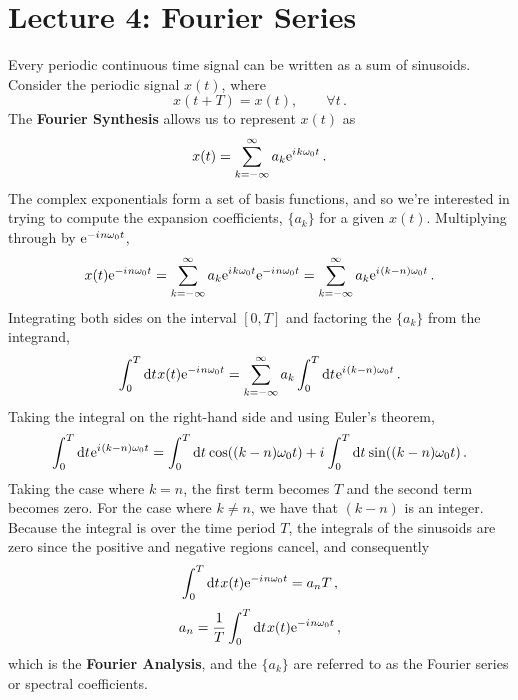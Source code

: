 \section{Lecture 4: Fourier Series}

Every periodic continuous time signal can be written as a sum of sinusoids. Consider
the periodic signal $x(t)$, where
%
\begin{displaymath}
  x(t + T) = x(t), \qquad \forall t \,.
\end{displaymath}
%
The \textbf{Fourier Synthesis} allows us to represent $x(t)$ as
%
\begin{equation}
  x(t) = \sum_{k=-\infty}^\infty a_k\mathrm{e}^{{i\mkern1mu} k\omega_0 t} \,.
\end{equation}
%
The complex exponentials form a set of basis functions, and so we're interested in
trying to compute the expansion coefficients, $\{a_k\}$ for a given $x(t)$.
Multiplying through by $\mathrm{e}^{-{i\mkern1mu} n \omega_0 t}$,
%
\begin{displaymath}
  x(t)\mathrm{e}^{-{i\mkern1mu} n\omega_0 t} = \sum_{k=-\infty}^\infty a_k\mathrm{e}^{{i\mkern1mu} k\omega_0 t}\mathrm{e}^{-{i\mkern1mu} n\omega_0 t}
  = \sum_{k=-\infty}^\infty a_k\mathrm{e}^{{i\mkern1mu} (k-n)\omega_0 t} \,.
\end{displaymath}
%
Integrating both sides on the interval $[0,T]$ and factoring the $\{a_k\}$ from the integrand,
%
\begin{displaymath}
  \int_0^T \mathrm{d}t\mkern1mux(t)\mathrm{e}^{-{i\mkern1mu} n\omega_0 t} = \sum_{k=-\infty}^\infty a_k \int_0^T\mathrm{d}t\mkern1mu \mathrm{e}^{{i\mkern1mu} (k-n)\omega_0 t} \,.
\end{displaymath}
%
Taking the integral on the right-hand side and using Euler's theorem,
%
\begin{displaymath}
  \int_0^T\mathrm{d}t\mkern1mu \mathrm{e}^{{i\mkern1mu} (k-n)\omega_0 t} = \int_0^T\mathrm{d}t\mkern1mu \cos((k-n)\omega_0 t) + {i\mkern1mu}\int_0^T\mathrm{d}t\mkern1mu \sin((k-n)\omega_0 t) \,.
\end{displaymath}
%
Taking the case where $k=n$, the first term becomes $T$ and the second term becomes zero. For the
case where $k\neq n$, we have that $(k-n)$ is an integer. Because the integral is over the time
period $T$, the integrals of the sinusoids are zero since the positive and negative regions cancel,
and consequently
%
\begin{displaymath}
  \int_0^T \mathrm{d}t\mkern1mu x(t)\mathrm{e}^{-{i\mkern1mu} n\omega_0 t} = a_n T \,,
\end{displaymath}
%
\begin{equation}
  a_n = \frac{1}{T}\int_0^T \mathrm{d}t\mkern1mu x(t)\mathrm{e}^{-{i\mkern1mu} n\omega_0 t} \,,
\end{equation}
%
which is the \textbf{Fourier Analysis}, and the $\{a_k\}$ are referred to as the Fourier series or
spectral coefficients.


